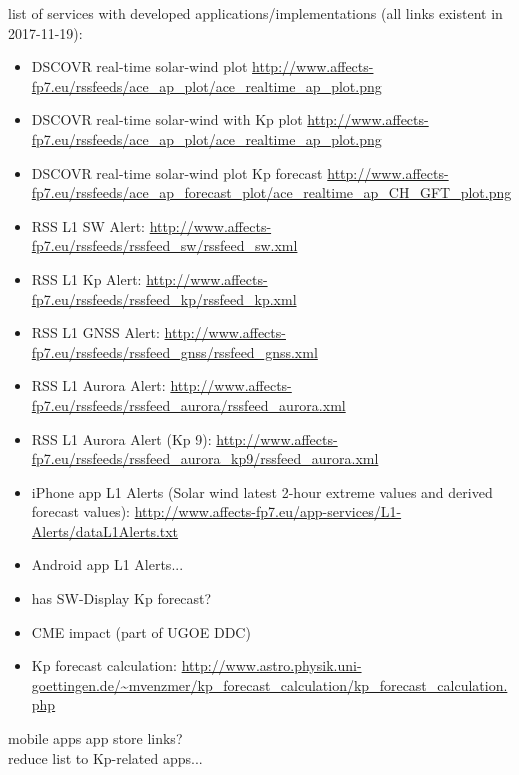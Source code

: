 list of services with \Kp{} developed applications/implementations (all links existent in 2017-11-19):\\
\begin{itemize}
	\item DSCOVR real-time solar-wind plot \url{http://www.affects-fp7.eu/rssfeeds/ace_ap_plot/ace_realtime_ap_plot.png}
	\item DSCOVR real-time solar-wind with Kp plot \url{http://www.affects-fp7.eu/rssfeeds/ace_ap_plot/ace_realtime_ap_plot.png}
	\item DSCOVR real-time solar-wind plot Kp forecast \url{http://www.affects-fp7.eu/rssfeeds/ace_ap_forecast_plot/ace_realtime_ap_CH_GFT_plot.png}
	\item RSS L1 SW Alert: \url{http://www.affects-fp7.eu/rssfeeds/rssfeed_sw/rssfeed_sw.xml}
	\item RSS L1 Kp Alert: \url{http://www.affects-fp7.eu/rssfeeds/rssfeed_kp/rssfeed_kp.xml}
	\item RSS L1 GNSS Alert: \url{http://www.affects-fp7.eu/rssfeeds/rssfeed_gnss/rssfeed_gnss.xml}
	\item RSS L1 Aurora Alert: \url{http://www.affects-fp7.eu/rssfeeds/rssfeed_aurora/rssfeed_aurora.xml}
	\item RSS L1 Aurora Alert (Kp 9): \url{http://www.affects-fp7.eu/rssfeeds/rssfeed_aurora_kp9/rssfeed_aurora.xml}
	\item iPhone app L1 Alerts (Solar wind latest 2-hour extreme values and derived forecast values): \url{http://www.affects-fp7.eu/app-services/L1-Alerts/dataL1Alerts.txt}
	\item Android app L1 Alerts...
	\item has SW-Display Kp forecast?
	\item CME \Kp{} impact (part of UGOE DDC)
	\item Kp forecast calculation: \url{http://www.astro.physik.uni-goettingen.de/~mvenzmer/kp_forecast_calculation/kp_forecast_calculation.php}
\end{itemize}

mobile apps app store links?\\

reduce list to Kp-related apps...\\


